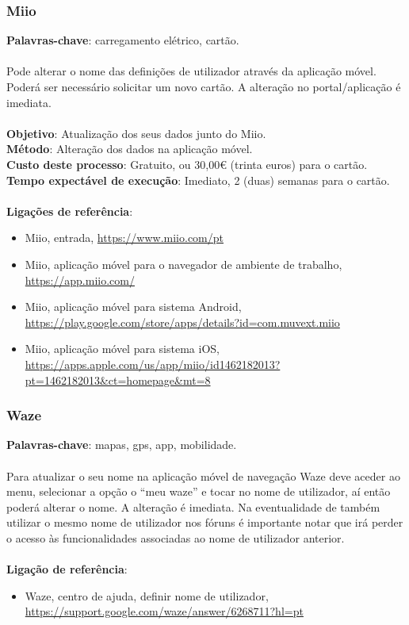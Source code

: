 \subsubsection{Miio}

\textbf{Palavras-chave}: carregamento elétrico, cartão. \\
\\
Pode alterar o nome das definições de utilizador através da aplicação
móvel. Poderá ser necessário solicitar um novo cartão. A alteração no
portal/aplicação é imediata. \\
\\
\textbf{Objetivo}: Atualização dos seus dados junto do Miio. \\
\textbf{Método}: Alteração dos dados na aplicação móvel. \\
\textbf{Custo deste processo}: Gratuito, ou 30,00€ (trinta euros) para o cartão. \\
\textbf{Tempo expectável de execução}: Imediato, 2 (duas) semanas para o cartão. \\
\\
\textbf{Ligações de referência}:
\begin{itemize}
	\item Miio, entrada, \url{https://www.miio.com/pt}
	\item Miio, aplicação móvel para o navegador de ambiente de trabalho, \url{https://app.miio.com/}
	\item Miio, aplicação móvel para sistema Android, \url{https://play.google.com/store/apps/details?id=com.muvext.miio}
	\item Miio, aplicação móvel para sistema iOS, \url{https://apps.apple.com/us/app/miio/id1462182013?pt=1462182013\&ct=homepage\&mt=8}
\end{itemize}

\subsubsection{Waze}

\textbf{Palavras-chave}: mapas, gps, app, mobilidade. \\
\\
Para atualizar o seu nome na aplicação móvel de navegação Waze deve
aceder ao menu, selecionar a opção o ``meu waze'' e tocar no nome de
utilizador, aí então poderá alterar o nome. A alteração é imediata. Na
eventualidade de também utilizar o mesmo nome de utilizador nos fóruns é
importante notar que irá perder o acesso às funcionalidades associadas
ao nome de utilizador anterior. \\
\\
\textbf{Ligação de referência}:
\begin{itemize}
	\item Waze, centro de ajuda, definir nome de utilizador, \url{https://support.google.com/waze/answer/6268711?hl=pt}
\end{itemize}

